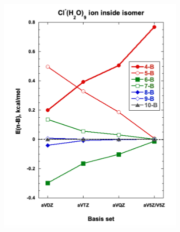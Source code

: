 \documentclass[11pt, proquest]{uwthesis}[2020/02/24]
\begin{document}
\begin{figure}
  \begin{subfigure}[t]{.5\textwidth}
    \centering
    \includegraphics[width=\linewidth]{Figures/Chapter_3/figure_8_bl.pdf}
  \end{subfigure}
  \hfill
  \begin{subfigure}[t]{.5\textwidth}
    \centering

\end{subfigure}
\end{figure}
\end{document}
